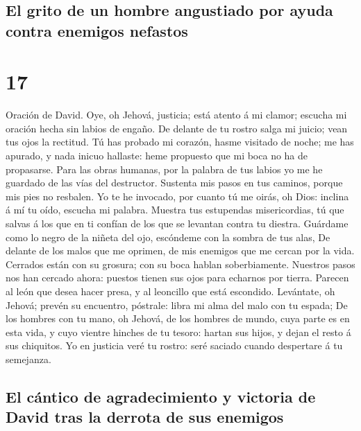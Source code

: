 \hypertarget{el-grito-de-un-hombre-angustiado-por-ayuda-contra-enemigos-nefastos}{%
\subsection{El grito de un hombre angustiado por ayuda contra enemigos
nefastos}\label{el-grito-de-un-hombre-angustiado-por-ayuda-contra-enemigos-nefastos}}

\hypertarget{section-16}{%
\section{17}\label{section-16}}

 Oración de David. Oye, oh Jehová, justicia; está atento á
mi clamor; escucha mi oración hecha sin labios de engaño. 
De delante de tu rostro salga mi juicio; vean tus ojos la rectitud.
 Tú has probado mi corazón, hasme visitado de noche; me
has apurado, y nada inicuo hallaste: heme propuesto que mi boca no ha de
propasarse.  Para las obras humanas, por la palabra de tus
labios yo me he guardado de las vías del destructor. 
Sustenta mis pasos en tus caminos, porque mis pies no resbalen.
 Yo te he invocado, por cuanto tú me oirás, oh Dios:
inclina á mí tu oído, escucha mi palabra.  Muestra tus
estupendas misericordias, tú que salvas á los que en ti confían de los
que se levantan contra tu diestra.  Guárdame como lo negro
de la niñeta del ojo, escóndeme con la sombra de tus alas,
 De delante de los malos que me oprimen, de mis enemigos
que me cercan por la vida.  Cerrados están con su
grosura; con su boca hablan soberbiamente.  Nuestros
pasos nos han cercado ahora: puestos tienen sus ojos para echarnos por
tierra.  Parecen al león que desea hacer presa, y al
leoncillo que está escondido.  Levántate, oh Jehová;
prevén su encuentro, póstrale: libra mi alma del malo con tu espada;
 De los hombres con tu mano, oh Jehová, de los hombres de
mundo, cuya parte es en esta vida, y cuyo vientre hinches de tu tesoro:
hartan sus hijos, y dejan el resto á sus chiquitos.  Yo
en justicia veré tu rostro: seré saciado cuando despertare á tu
semejanza.

\hypertarget{el-cuxe1ntico-de-agradecimiento-y-victoria-de-david-tras-la-derrota-de-sus-enemigos}{%
\subsection{El cántico de agradecimiento y victoria de David tras la
derrota de sus
enemigos}\label{el-cuxe1ntico-de-agradecimiento-y-victoria-de-david-tras-la-derrota-de-sus-enemigos}}

